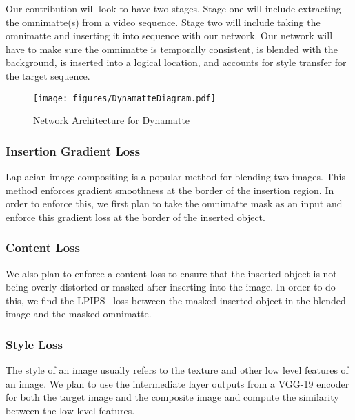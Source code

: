 \documentclass{article}
\begin{document}

Our contribution will look to have two stages. Stage one will include extracting the omnimatte(s) from a video sequence. Stage two will include taking the omnimatte and inserting it into sequence with our network. Our network will have to make sure the omnimatte is temporally consistent, is blended with the background, is inserted into a logical location, and accounts for style transfer for the target sequence.

\begin{figure}
    \centering
    \texttt{[image: figures/DynamatteDiagram.pdf]}
    \caption{Network Architecture for Dynamatte}
    \label{fig:DynamatteArchitecture}
\end{figure}

\subsubsection{Insertion Gradient Loss}
Laplacian image compositing is a popular method for blending two images. This method enforces gradient smoothness at the border of the insertion region. In order to enforce this, we first plan to take the omnimatte mask as an input and enforce this gradient loss at the border of the inserted object. 

\subsubsection{Content Loss}
We also plan to enforce a content loss to ensure that the inserted object is not being overly distorted or masked after inserting into the image. In order to do this, we find the LPIPS~\cite{zhang2018unreasonable} loss between the masked inserted object in the blended image and the masked omnimatte.

\subsubsection{Style Loss}
The style of an image usually refers to the texture and other low level features of an image. We plan to use the intermediate layer outputs from a VGG-19 encoder for both the target image and the composite image and compute the similarity between the low level features.
\end{document}
